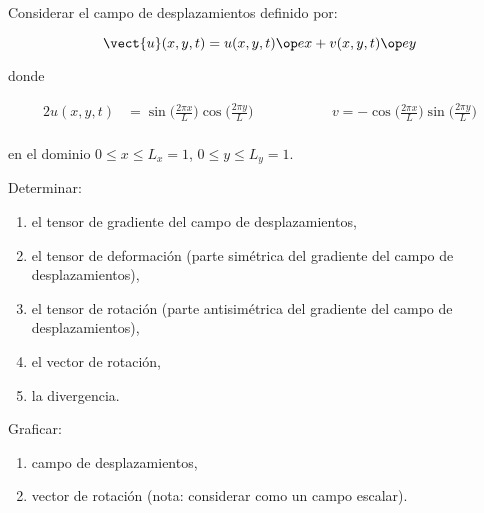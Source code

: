 \documentclass[./../main.tex]{subfiles}
\begin{document}
    \section{}

    Considerar el campo de desplazamientos definido por:

    \begin{equation*}
        \vect{u}(x, y, t) = u(x, y, t)\ex + v(x, y, t)\ey
    \end{equation*}

    donde

    \begin{alignat*}{2}
        u(x, y, t) &= \sin\bigl(\tfrac{2\pi x}{L}\bigr)\cos\bigl(\tfrac{2\pi y}{L}\bigr) &\qquad\qquad & v = -\cos\bigl(\tfrac{2\pi x}{L}\bigr)\sin\bigl(\tfrac{2\pi y}{L}\bigr) \\
    \end{alignat*}

    en el dominio \(0 \leq x \leq L_{x} = 1\), \(0 \leq y \leq L_{y} = 1\).
    
    Determinar:

    \begin{enumerate}[label=\arabic*)]
        \item el tensor de gradiente del campo de desplazamientos,
        \item el tensor de deformación (parte simétrica del gradiente del campo de desplazamientos),
        \item el tensor de rotación (parte antisimétrica del gradiente del campo de desplazamientos),
        \item el vector de rotación,
        \item la divergencia. 
    \end{enumerate}

    Graficar:

    \begin{enumerate}[resume, label=\arabic*)]
        \item campo de desplazamientos,
        \item vector de rotación (nota: considerar como un campo escalar).
    \end{enumerate}
\end{document}
